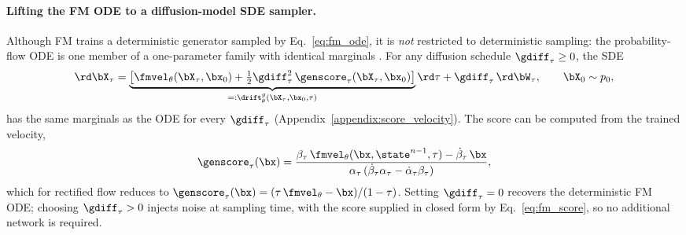 \paragraph{Lifting the FM ODE to a diffusion-model SDE sampler.}
Although FM trains a deterministic generator sampled by Eq.~\eqref{eq:fm_ode}, it is \emph{not} restricted to deterministic sampling: the probability-flow ODE is one member of a one-parameter family with identical marginals \cite{song_score-based_2021, ma_sit_2024}. For any diffusion schedule $\gdiff_\tau\ge 0$, the SDE
\begin{align}\label{eq:general_sde_family}
    \rd\bX_\tau
    = \underbrace{\left[\fmvel_\theta(\bX_\tau,\bx_0) + \tfrac{1}{2}\gdiff_\tau^2\,\genscore_\tau(\bX_\tau,\bx_0)\right]}_{=:\drift_\theta^{g}(\bX_\tau,\bx_0,\tau)}\rd\tau
    + \gdiff_\tau\,\rd\bW_\tau, \qquad \bX_0\sim p_0,
\end{align}
has the same marginals as the ODE for every $\gdiff_\tau$ (Appendix~\ref{appendix:score_velocity}). The score can be computed from the trained velocity,
\begin{align}\label{eq:fm_score}
    \genscore_\tau(\bx) = \frac{\beta_\tau\,\fmvel_\theta(\bx,\state^{n-1},\tau) - \dot\beta_\tau\,\bx}{\alpha_\tau\,(\dot\beta_\tau\alpha_\tau - \dot\alpha_\tau\beta_\tau)},
\end{align}
which for rectified flow reduces to $\genscore_\tau(\bx) = (\tau\,\fmvel_\theta - \bx)/(1-\tau)$. Setting $\gdiff_\tau=0$ recovers the deterministic FM ODE; choosing $\gdiff_\tau>0$ injects noise at sampling time, with the score supplied in closed form by Eq.~\eqref{eq:fm_score}, so no additional network is required. 


